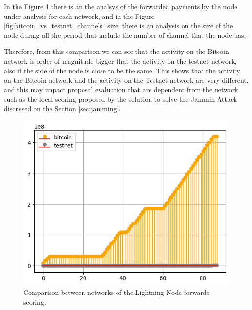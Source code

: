 In the Figure \ref{fig:bitcoin_vs_testnet_forwards} there is an the analsys of the forwarded payments by 
the node under analysis for each network, and in the Figure \ref{fig:bitcoin_vs_testnet_channels_size} there is an 
analysis on the size of the node during all the period that include the number of channel that the node 
has.

Therefore, from this comparison we can see that the activity on the Bitcoin network 
is order of magnitude bigger that the activity on the testnet network, also if the 
side of the node is close to be the same. This shows that the activity on the Bitcoin network and 
the activity on the Testnet network are very different, and this may impact proposal evaluation 
that are dependent from the network such as the local scoring proposed by the solution to solve 
the Jammin Attack discussed on the Section \ref{sec:jamming}.

\begin{figure}[H]
    \begin{center}
        \includegraphics[scale=0.7]{imgs/bitcoin_vs_testnet_forwards.png}
    \end{center}
    \caption{Comparison between networks of the Lightning Node forwards scoring.}
    \label{fig:bitcoin_vs_testnet_forwards}
\end{figure}

